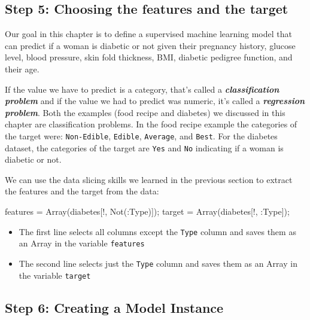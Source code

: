 \documentclass[
  letterpaper,
]{book}
\newenvironment{Shaded}{\begin{snugshade}}{\end{snugshade}}
\newcommand{\DataTypeTok}[1]{\textcolor[rgb]{0.68,0.00,0.00}{#1}}
\newcommand{\FunctionTok}[1]{\textcolor[rgb]{0.28,0.35,0.67}{#1}}
\newcommand{\NormalTok}[1]{\textcolor[rgb]{0.00,0.23,0.31}{#1}}
\newcommand{\OperatorTok}[1]{\textcolor[rgb]{0.37,0.37,0.37}{#1}}
\providecommand{\tightlist}{%
  \setlength{\itemsep}{0pt}\setlength{\parskip}{0pt}}\usepackage{longtable,booktabs,array}
\begin{document}
\hypertarget{step-5-choosing-the-features-and-the-target}{%
\subsection*{Step 5: Choosing the features and the
target}\label{step-5-choosing-the-features-and-the-target}}

Our goal in this chapter is to define a supervised machine learning
model that can predict if a woman is diabetic or not given their
pregnancy history, glucose level, blood pressure, skin fold thickness,
BMI, diabetic pedigree function, and their age.

If the value we have to predict is a category, that's called a
\textbf{\emph{classification problem }} and if the value we had to
predict was numeric, it's called a \textbf{\emph{regression problem}}.
Both the examples (food recipe and diabetes) we discussed in this
chapter are classification problems. In the food recipe example the
categories of the target were: \texttt{Non-Edible}, \texttt{Edible},
\texttt{Average}, and \texttt{Best}. For the diabetes dataset, the
categories of the target are \texttt{Yes} and \texttt{No} indicating if
a woman is diabetic or not.

We can use the data slicing skills we learned in the previous section to
extract the features and the target from the data:

\begin{Shaded}
\begin{Highlighting}[]
\NormalTok{features }\OperatorTok{=} \FunctionTok{Array}\NormalTok{(diabetes[!, }\FunctionTok{Not}\NormalTok{(}\OperatorTok{:}\DataTypeTok{Type}\NormalTok{)]);}
\NormalTok{target }\OperatorTok{=} \FunctionTok{Array}\NormalTok{(diabetes[!, }\OperatorTok{:}\DataTypeTok{Type}\NormalTok{]);}
\end{Highlighting}
\end{Shaded}

\begin{itemize}
\tightlist
\item
  The first line selects all columns except the \texttt{Type} column and
  saves them as an Array in the variable \texttt{features}
\item
  The second line selects just the \texttt{Type} column and saves them
  as an Array in the variable \texttt{target}
\end{itemize}

\hypertarget{step-6-creating-a-model-instance}{%
\subsection*{Step 6: Creating a Model
Instance}\label{step-6-creating-a-model-instance}}
\end{document}
